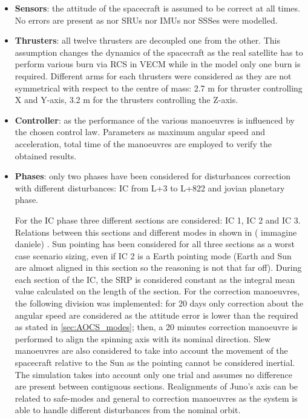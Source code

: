 \begin{itemize}
    \item \textbf{Sensors}: the attitude of the spacecraft is assumed to be correct at all times. No errors are present as nor SRUs nor IMUs nor SSSes were modelled. 
    
    \item \textbf{Thrusters}: all twelve thrusters are decoupled one from the other. This assumption changes the dynamics of the spacecraft as the real satellite has to perform various burn via RCS in VECM while in the model only one burn is required. 
    Different arms for each thrusters were considered as they are not symmetrical with respect to the centre of mass: 2.7 m for thruster controlling X and Y-axis, 3.2 m for the thrusters controlling the Z-axis.

    \item \textbf{Controller}: as the performance of the various manoeuvres is influenced by the chosen control law. Parameters as maximum angular speed and acceleration, total time of the manoeuvres are employed to verify the obtained results. 
    
    \item \textbf{Phases}: only two phases have been considered for disturbances correction with different disturbances: IC from L+3 to L+822 and jovian planetary phase. 
    
    For the IC phase three different sections are considered: IC 1, IC 2 and IC 3. Relations between this sections and different modes in shown in \mref ( immagine daniele) .
    Sun pointing has been considered for all three sections as a worst case scenario sizing, even if IC 2 is a Earth pointing mode (Earth and Sun are almost aligned in this section so the reasoning is not that far off). During each section of the IC, the SRP is considered constant as the integral mean value calculated on the length of the section.
     For the correction manoeuvres, the following division was implemented: for 20 days only correction about the angular speed are considered as the attitude error is lower than the required as stated in \autoref{sec:AOCS_modes}; then, a 20 minutes correction manoeuvre is performed to align the spinning axis with its nominal direction. Slew manoeuvres are also considered to take into account the movement of the spacecraft relative to the Sun as the pointing cannot be considered inertial. The simulation takes into account only one trial and assumes no difference are present between contiguous sections. Realignments of Juno's axis can be related to safe-modes and general to correction manoeuvres as the system is able to handle different disturbances from the nominal orbit. 
    

\end{itemize}
